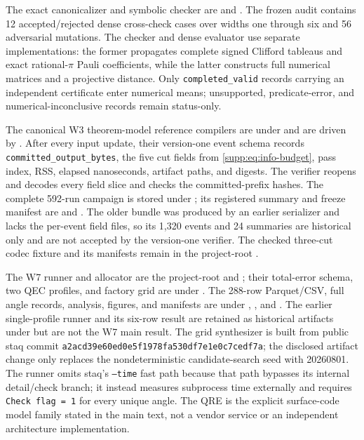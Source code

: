 The exact canonicalizer and symbolic checker are
 and
.  The frozen audit
 contains 12 accepted/rejected dense
cross-check cases over widths one through six and 56 adversarial mutations.
The checker and dense evaluator use separate implementations: the former
propagates complete signed Clifford tableaus and exact rational-$\pi$ Pauli
coefficients, while the latter constructs full numerical matrices and a
projective distance.  Only \texttt{completed\_valid} records carrying an
independent certificate enter numerical means; unsupported, predicate-error,
and numerical-inconclusive records remain status-only.

The canonical W3 theorem-model reference compilers are under
 and are driven by
.  After every input update, their
version-one event schema records \texttt{committed\_output\_bytes}, the five
cut fields from \eqref{supp:eq:info-budget}, pass index, RSS, elapsed nanoseconds,
artifact paths, and digests.  The verifier reopens and decodes every field
slice and checks the committed-prefix hashes.  The complete 592-run campaign
is stored under ; its registered
summary and freeze manifest are  and
.  The older
 bundle was produced by an earlier serializer and
lacks the per-event field files, so its 1,320 events and 24 summaries are
historical only and are not accepted by the version-one verifier.  The checked
three-cut codec fixture and its manifests remain in the project-root
.

The W7 runner and allocator are the project-root
 and
; their total-error schema, two QEC
profiles, and factory grid are under .  The 288-row Parquet/CSV,
full angle records, analysis, figures, and manifests are under
, , and
.  The earlier single-profile runner and its six-row result are
retained as historical artifacts under  but
are not the W7 main result.  The grid synthesizer is built from
public staq commit
\texttt{a2acd39e60ed0e5f1978fa530df7e1e0c7cedf7a}; the disclosed artifact change
only replaces the nondeterministic candidate-search seed with 20260801.  The
runner omits staq's \texttt{--time} fast path because that path bypasses its
internal detail/check branch; it instead measures subprocess time externally
and requires \texttt{Check flag = 1} for every unique angle.  The QRE is the
explicit surface-code model family stated in the main text, not a vendor
service or an independent architecture implementation.

